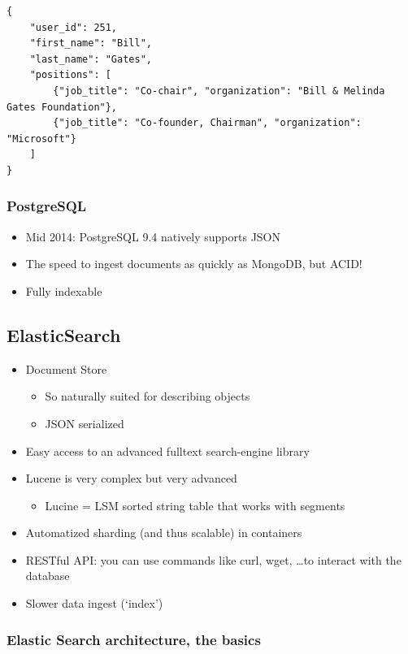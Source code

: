 \documentclass{article}
\begin{document}
\begin{verbatim}
{
    "user_id": 251,
    "first_name": "Bill",
    "last_name": "Gates",
    "positions": [
        {"job_title": "Co-chair", "organization": "Bill & Melinda Gates Foundation"},
        {"job_title": "Co-founder, Chairman", "organization": "Microsoft"}
    ]
}
\end{verbatim}

\subsubsection{PostgreSQL}

\begin{itemize}
    \item Mid 2014: PostgreSQL 9.4 natively supports JSON
    \item The speed to ingest documents as quickly as MongoDB, but ACID!
    \item Fully indexable
\end{itemize}

\subsection{ElasticSearch}

\begin{itemize}
    \item Document Store
    \begin{itemize}
        \item So naturally suited for describing objects
        \item JSON serialized
    \end{itemize}
    \item Easy access to an advanced fulltext search-engine library
    \item Lucene is very complex but very advanced
    \begin{itemize}
        \item Lucine = LSM sorted string table that works with segments
    \end{itemize}
    \item Automatized sharding (and thus scalable) in containers
    \item RESTful API: you can use commands like curl, wget, \dots to interact with the database
    \item Slower data ingest (`index')
\end{itemize}

\subsubsection{Elastic Search architecture, the basics}
\end{document}

